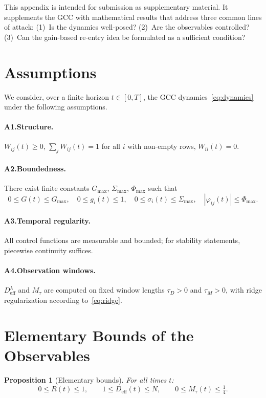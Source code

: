 \documentclass[11pt,a4paper]{article}
\theoremstyle{plain}
\newtheorem{proposition}[theorem]{Proposition}
\theoremstyle{definition}
\theoremstyle{remark}
\newcommand{\Deff}{D_{\mathrm{eff}}}
\newcommand{\Mtau}{M_{\tau}}
\newcommand{\Gmax}{G_{\max}}
\begin{document}
This appendix is intended for submission as supplementary material. It supplements the GCC with mathematical results that address three common lines of attack: (1)~Is the dynamics well-posed? (2)~Are the observables controlled? (3)~Can the gain-based re-entry idea be formulated as a sufficient condition?

\section{Assumptions}
\label{app:voraussetzungen}

We consider, over a finite horizon $t \in [0,T]$, the GCC dynamics~\eqref{eq:dynamics} under the following assumptions.

\paragraph{A1.\;Structure.}
$W_{ij}(t) \geq 0$, \;\;$\sum_j W_{ij}(t) = 1$ for all $i$ with non-empty rows, \;\;$W_{ii}(t) = 0$.

\paragraph{A2.\;Boundedness.}
There exist finite constants $\Gmax$, $\Sigma_{\max}$, $\Phi_{\max}$ such that
\[
0 \leq G(t) \leq \Gmax, \quad
0 \leq g_i(t) \leq 1, \quad
0 \leq \sigma_i(t) \leq \Sigma_{\max}, \quad
|\varphi_{ij}(t)| \leq \Phi_{\max}.
\]

\paragraph{A3.\;Temporal regularity.}
All control functions are measurable and bounded; for stability statements, piecewise continuity suffices.

\paragraph{A4.\;Observation windows.}
$\Deff^{\lambda}$ and $\Mtau$ are computed on fixed window lengths $\tau_D > 0$ and $\tau_M > 0$, with ridge regularization according to~\eqref{eq:ridge}.

\section{Elementary Bounds of the Observables}

\begin{proposition}[Elementary bounds]
\label{prop:schranken}
For all times $t$:
\begin{equation}
0 \leq R(t) \leq 1, \qquad
1 \leq \Deff(t) \leq N, \qquad
0 \leq \Mtau(t) \leq \tfrac{1}{4}.
\end{equation}
\end{proposition}
\end{document}
